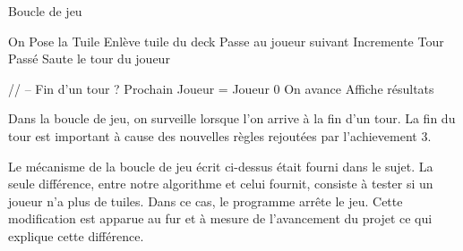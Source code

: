\documentclass[a4paper]{article}
\begin{document}
\begin{algorithm}
    \caption{Boucle de jeu}
    \begin{algorithmic}
                \STATE On Pose la Tuile
                \STATE Enlève tuile du deck 
                \STATE Passe au joueur suivant
            \ELSE
                \STATE Incremente Tour Passé
                \STATE Saute le tour du joueur
            \ENDIF
        
            \STATE // -- Fin d'un tour ?
                \STATE Prochain Joueur = Joueur 0
            \ELSE
                \STATE On avance
            \ENDIF
        \ENDIF
    \STATE Affiche résultats
    \ENDWHILE
    
    \end{algorithmic}
\end{algorithm}

Dans la boucle de jeu, on surveille lorsque l'on arrive à la fin d'un tour. La fin du tour est important à cause des nouvelles règles rejoutées par l'achievement 3. \\
\newline
\newline

Le mécanisme de la boucle de jeu écrit ci-dessus était fourni dans le sujet. La seule différence, entre notre algorithme et celui fournit, consiste à tester si un joueur n'a plus de tuiles. Dans ce cas, le programme arrête le jeu. Cette modification est apparue au fur et à mesure de l'avancement du projet ce qui explique cette différence. \\
\end{document}
